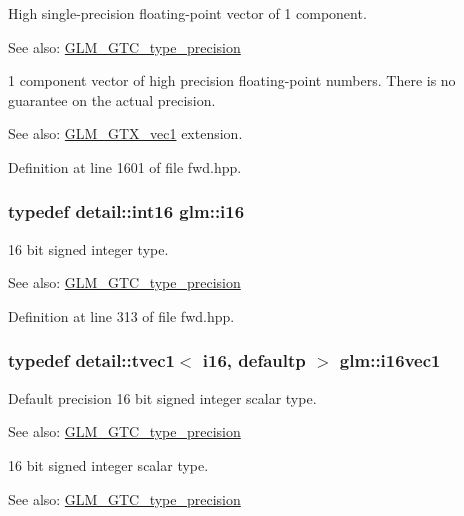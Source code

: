 High single-precision floating-point vector of 1 component. \begin{Desc}
\item[See also:]\hyperlink{group__gtc__type__precision}{GLM\_\-GTC\_\-type\_\-precision}\end{Desc}
1 component vector of high precision floating-point numbers. There is no guarantee on the actual precision. \begin{Desc}
\item[See also:]\hyperlink{group__gtx__vec1}{GLM\_\-GTX\_\-vec1} extension. \end{Desc}


Definition at line 1601 of file fwd.hpp.\hypertarget{group__gtc__type__precision_g35e5542ca05b29cc256fdafb8503d1fd}{
\subsubsection[i16]{\setlength{\rightskip}{0pt plus 5cm}typedef detail::int16 {\bf glm::i16}}}
\label{group__gtc__type__precision_g35e5542ca05b29cc256fdafb8503d1fd}


16 bit signed integer type. \begin{Desc}
\item[See also:]\hyperlink{group__gtc__type__precision}{GLM\_\-GTC\_\-type\_\-precision} \end{Desc}


Definition at line 313 of file fwd.hpp.\hypertarget{group__gtc__type__precision_ga3a2fe05ca6a7086c5580922ebda4bf3}{
\subsubsection[i16vec1]{\setlength{\rightskip}{0pt plus 5cm}typedef detail::tvec1$<$ i16, defaultp $>$ {\bf glm::i16vec1}}}
\label{group__gtc__type__precision_ga3a2fe05ca6a7086c5580922ebda4bf3}


Default precision 16 bit signed integer scalar type. \begin{Desc}
\item[See also:]\hyperlink{group__gtc__type__precision}{GLM\_\-GTC\_\-type\_\-precision}\end{Desc}
16 bit signed integer scalar type. \begin{Desc}
\item[See also:]\hyperlink{group__gtc__type__precision}{GLM\_\-GTC\_\-type\_\-precision} \end{Desc}


